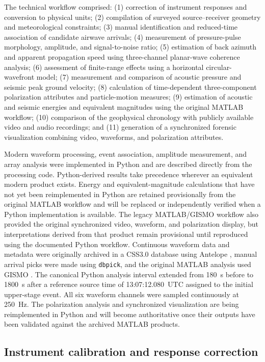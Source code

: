\documentclass[]{seismica}
\begin{document}
The technical workflow comprised:
(1) correction of instrument responses and conversion to physical units;
(2) compilation of surveyed source--receiver geometry and meteorological
constraints;
(3) manual identification and reduced-time association of candidate airwave
arrivals;
(4) measurement of pressure-pulse morphology, amplitude, and signal-to-noise
ratio;
(5) estimation of back azimuth and apparent propagation speed using
three-channel planar-wave coherence analysis;
(6) assessment of finite-range effects using a horizontal circular-wavefront
model;
(7) measurement and comparison of acoustic pressure and seismic peak ground
velocity;
(8) calculation of time-dependent three-component polarization attributes and
particle-motion measures;
(9) estimation of acoustic and seismic energies and equivalent magnitudes
using the original MATLAB workflow;
(10) comparison of the geophysical chronology with publicly available video
and audio recordings; and
(11) generation of a synchronized forensic visualization combining video,
waveforms, and polarization attributes.

Modern waveform processing, event association, amplitude measurement, and
array analysis were implemented in Python and are described directly from the
processing code. Python-derived results take precedence wherever an equivalent
modern product exists. Energy and equivalent-magnitude calculations that have
not yet been reimplemented in Python are retained provisionally from the
original MATLAB workflow and will be replaced or independently verified when a
Python implementation is available. The legacy MATLAB/GISMO workflow also
provided the original synchronized video, waveform, and polarization display,
but interpretations derived from that product remain provisional until
reproduced using the documented Python workflow. Continuous waveform data and
metadata were originally archived in a CSS3.0 database using Antelope
\citep{brtt_antelope}, manual arrival picks were made using
\texttt{dbpick}, and the original MATLAB analysis used GISMO
\citep{thompson_gismo_2017}. The canonical Python analysis interval extended from 180~s
before to 1800~s after a reference source time of 13:07:12.080~UTC assigned to
the initial upper-stage event. All six waveform channels were sampled
continuously at 250~Hz. The polarization analysis and synchronized visualization are being
reimplemented in Python and will become authoritative once their outputs have
been validated against the archived MATLAB products.


\subsection{Instrument calibration and response correction}
\end{document}
